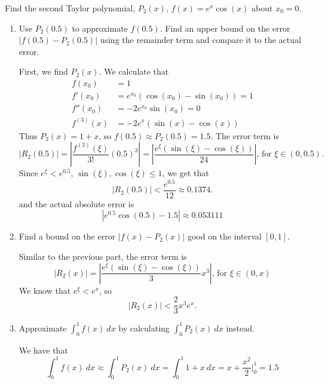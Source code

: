 \documentclass{article}
\theoremstyle{plain} %
\numberwithin{thm}{section} %
\theoremstyle{definition}
\begin{document}
    \begin{question}{3}
        Find the second Taylor polynomial, \(P_2(x)\), \(f(x) = e^x \cos (x)\) about \(x_0 = 0\).
        \begin{enumerate}[label=(\alph*)]
            \item Use \(P_2(0.5)\) to approximate \(f(0.5)\). Find an upper bound on the error \(|f(0.5) - P_2(0.5)|\) using the remainder term and compare it to the actual error.
            
            First, we find \(P_2(x)\). We calculate that
            \begin{align*}
                f(x_0) &= 1 \\
                f'(x_0) &= e^{x_0}(\cos (x_0) - \sin (x_0)) = 1 \\
                f''(x_0) &= -2e^{x_0}\sin (x_0) = 0 \\
                f^{(3)}(x) &= -2e^{x} (\sin (x) - \cos (x))
            \end{align*}
            Thus \(P_2(x) = 1 + x\), so \(f(0.5) \approx P_2(0.5) = 1.5\). The error term is
            \[
                |R_2(0.5)| = \left\vert \dfrac{f^{(3)}(\xi)}{3!}(0.5)^{3} \right\vert = \left\vert \dfrac{e^{\xi } (\sin (\xi ) - \cos (\xi ))}{24} \right\vert \text{, for } \xi \in (0, 0.5).
            \]
            Since \(e^{\xi} < e^{0.5}\), \(\sin (\xi), \cos (\xi) \leq 1\), we get that
            \[
                |R_2(0.5)| < \frac{e^{0.5}}{12} \approx 0.1374.
            \]
            and the actual absolute error is
            \[
                \left\vert e^{0.5} \cos (0.5) - 1.5 \right\vert \approx 0.053111
            \]

            \item Find a bound on the error \(|f(x) - P_2(x)|\) good on the interval \([0,1]\).
            
            Similar to the previous part, the error term is
            \[
                |R_2(x)| = \left\vert \frac{e^{\xi}(\sin (\xi ) - \cos (\xi ))}{3}x^3 \right\vert \text{, for } \xi  \in (0, x)
            \]
            We know that \(e^{\xi} < e^x\), so
            \[
                |R_2(x)| < \frac{2}{3} x^3e^x.
            \]

            \item Approximate \(\int _0^1 f(x)\ dx\) by calculating \(\int _0^1 P_2(x)\ dx\) instead.
            
            We have that
            \[
                \int _0^1 f(x)\ dx \approx \int _0^1 P_2(x)\ dx = \int _0^1 1 + x\ dx = x + \frac{x^2}{2} \Big|_0^1 = 1.5
            \]


\end{enumerate}
\end{question}
\end{document}
